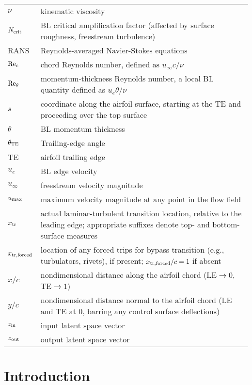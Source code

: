\documentclass[journal]{new-aiaa}
\begin{document}
{\begin{longtable*}{@{}l @{\quad=\quad} p{5in}@{}}
      $\nu$ & kinematic viscosity \\
      $N_{\rm crit}$ & BL critical amplification factor (affected by surface roughness, freestream turbulence) \\
      RANS & Reynolds-averaged Navier-Stokes equations \\
      $\rm Re_c$ & chord Reynolds number, defined as $u_\infty c / \nu$ \\
      $\rm Re_\theta$ & momentum-thickness Reynolds number, a local BL quantity defined as $u_e \theta / \nu$ \\
      $s$ & coordinate along the airfoil surface, starting at the TE and proceeding over the top surface \\
      $\theta$ & BL momentum thickness \\
      $\theta_{\rm TE}$ & Trailing-edge angle \\
      TE & airfoil trailing edge \\
      $u_e$ & BL edge velocity \\
      $u_\infty$ & freestream velocity magnitude \\
      $u_{\rm max}$ & maximum velocity magnitude at any point in the flow field \\
      $x_{\rm tr}$ & actual laminar-turbulent transition location, relative to the leading edge; appropriate suffixes denote top- and bottom-surface measures \\
      $x_{\rm tr, forced}$ & location of any forced trips for bypass transition (e.g., turbulators, rivets), if present; $x_{\rm tr, forced} / c = 1$ if absent\\
      $x / c$ & nondimensional distance along the airfoil chord ($\text{LE} \rightarrow 0$, $\text{TE} \rightarrow 1$) \\
      $y / c$ & nondimensional distance normal to the airfoil chord (LE and TE at 0, barring any control surface deflections) \\
      $z_{\rm in}$ & input latent space vector \\
      $z_{\rm out}$ & output latent space vector \\
  \end{longtable*}}


\section{Introduction}
\end{document}
